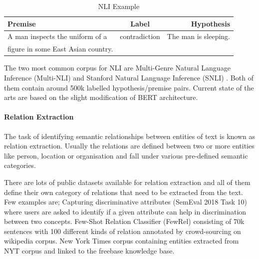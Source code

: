\begin{table}[h!]
  \begin{center}
    \caption{NLI Example}
    \label{tab:nli}
    \begin{tabular}{l|c|r} %
      \textbf{Premise} & \textbf{Label} & \textbf{Hypothesis}\\
      \hline
      A man inspects the uniform of a & contradiction & The man is sleeping.\\
      figure in some East Asian country. &  & 
    \end{tabular}
  \end{center}
\end{table}

The two most common corpus for NLI are Multi-Genre Natural Language Inference (Multi-NLI) \cite{williams2017broad} and Stanford Natural Language Inference (SNLI) \cite{bowman2015large}. Both of them contain around 500k labelled hypothesis/premise pairs. Current state of the arts are based on the slight modification of BERT architecture.

\paragraph{Relation Extraction}
The task of identifying semantic relationships between entities of text is known as relation extraction. Usually the relations are defined between two or more entities like person, location or organisation and fall under various pre-defined semantic categories.

There are lots of public datasets available for relation extraction and all of them define their own category of relations that need to be extracted from the text. Few examples are; Capturing discriminative attributes (SemEval 2018 Task 10) \cite{krebs2018semeval} where users are asked to identify if a given attribute can help in discrimination between two concepts. Few-Shot Relation Classifier (FewRel) \cite{han2018fewrel} consisting of 70k sentences with 100 different kinds of relation annotated by crowd-sourcing on wikipedia corpus. New York Times corpus \cite{riedel2010modeling} containing entities extracted from NYT corpus and linked to the freebase knowledge base. 


